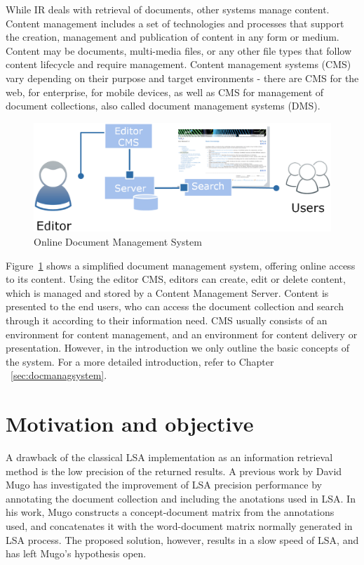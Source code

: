 While IR deals with retrieval of documents, other systems manage content. Content management includes a set of technologies and processes that support the creation, management and publication of content in any form or medium. Content may be documents, multi-media files, or any other file types that follow content lifecycle and require management. Content management systems (CMS) vary depending on their purpose and target environments - there are CMS for the web, for enterprise, for mobile devices, as well as CMS for management of document collections, also called document management systems (DMS). \\

%
%
\begin{figure}[htbp]
	\centering
	\includegraphics[width=\ScaleIfNeeded]{img/cms-simplified} 
	\caption{ Online Document Management System }
	\label{fig:docmachine}
\end{figure}

Figure~\ref{fig:docmachine} shows a simplified document management system, offering online access to its content. Using the editor CMS, editors can create, edit or delete content, which is managed and stored by a Content Management Server. Content is presented to the end users, who can access the document collection and search through it according to their information need. CMS usually consists of an environment for content management, and an environment for content delivery or presentation. However, in the introduction we only outline the basic concepts of the system. For a more detailed introduction, refer to Chapter ~\ref{sec:docmanagsystem}. \\


\section{Motivation and objective}
\label{sec:introduction:motandobj}  
A drawback of the classical LSA implementation as an information retrieval method is the low precision of the returned results. A previous work by David Mugo \cite{mugo10} has investigated the improvement of LSA precision performance by annotating the document collection and including the anotations used in LSA. In his work, Mugo constructs a concept-document matrix from the annotations used, and concatenates it with the word-document matrix normally generated in LSA process. The proposed solution, however, results in a slow speed of LSA, and has left Mugo's hypothesis open. \\

